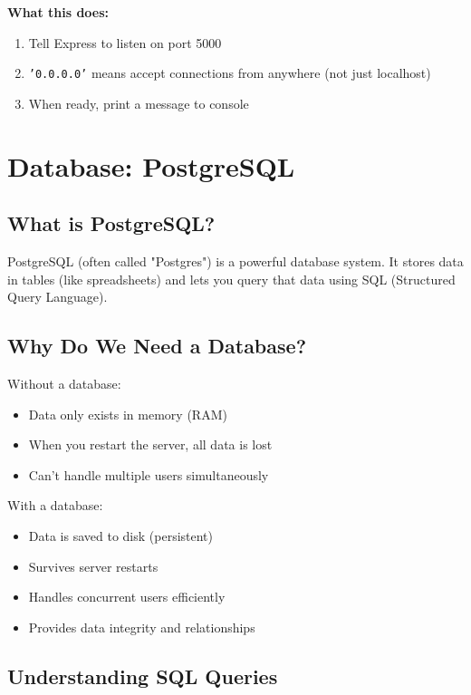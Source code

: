 \documentclass[12pt,a4paper]{article}
\begin{document}
\textbf{What this does:}
\begin{enumerate}
    \item Tell Express to listen on port 5000
    \item \texttt{'0.0.0.0'} means accept connections from anywhere (not just localhost)
    \item When ready, print a message to console
\end{enumerate}

\section{Database: PostgreSQL}

\subsection{What is PostgreSQL?}

PostgreSQL (often called "Postgres") is a powerful database system. It stores data in tables (like spreadsheets) and lets you query that data using SQL (Structured Query Language).

\subsection{Why Do We Need a Database?}

Without a database:
\begin{itemize}
    \item Data only exists in memory (RAM)
    \item When you restart the server, all data is lost
    \item Can't handle multiple users simultaneously
\end{itemize}

With a database:
\begin{itemize}
    \item Data is saved to disk (persistent)
    \item Survives server restarts
    \item Handles concurrent users efficiently
    \item Provides data integrity and relationships
\end{itemize}

\subsection{Understanding SQL Queries}
\end{document}
